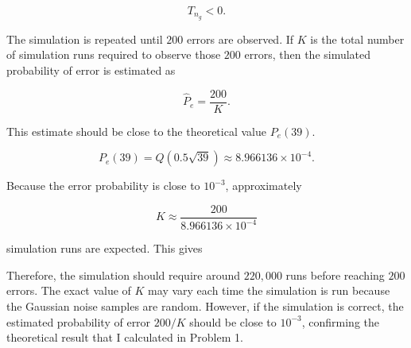 \documentclass[12pt,a4paper]{article}
\begin{document}
\[
T_{n_g}<0.
\]

The simulation is repeated until \(200\) errors are observed. If \(K\) is the total number of simulation runs required to observe those \(200\) errors, then the simulated probability of error is estimated as

\[
\hat{P}_e = \frac{200}{K}.
\]

This estimate should be close to the theoretical value $P_e(39)$.

\[
P_e(39)=Q(0.5\sqrt{39}) \approx 8.966136\times 10^{-4}.
\]

Because the error probability is close to \(10^{-3}\), approximately

\[
K \approx \frac{200}{8.966136\times 10^{-4}}
\]

simulation runs are expected. This gives

\begin{center}
\end{center}

Therefore, the simulation should require around $220,000$ runs before reaching \(200\) errors. The exact value of \(K\) may vary each time the simulation is run because the Gaussian noise samples are random. However, if the simulation is correct, the estimated probability of error \(200/K\) should be close to \(10^{-3}\), confirming the theoretical result that I calculated in Problem 1. 
\end{document}
